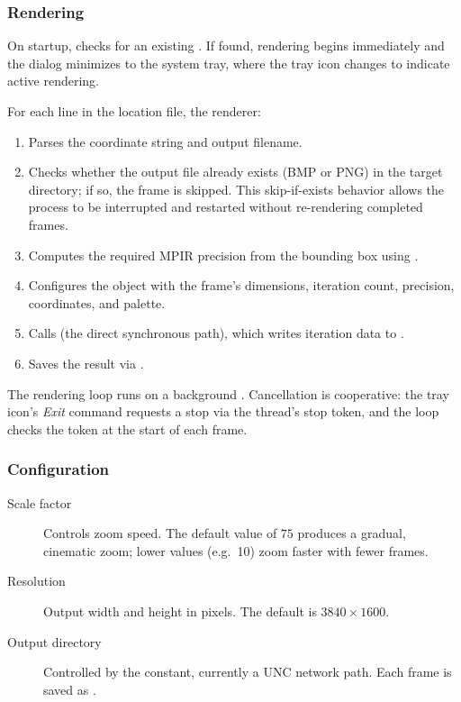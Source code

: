 \subsubsection*{Rendering}

On startup,  checks for an existing
.  If found, rendering begins immediately and
the dialog minimizes to the system tray, where the tray icon changes
to indicate active rendering.

For each line in the location file, the renderer:

\begin{enumerate}
  \item Parses the coordinate string and output filename.
  \item Checks whether the output file already exists (BMP or PNG) in
        the target directory; if so, the frame is skipped.  This
        skip-if-exists behavior allows the process to be interrupted
        and restarted without re-rendering completed frames.
  \item Computes the required MPIR precision from the bounding box
        using .
  \item Configures the  object with the frame's
        dimensions, iteration count, precision, coordinates, and
        palette.
  \item Calls  (the direct synchronous path),
        which writes iteration data to .
  \item Saves the result via .
\end{enumerate}

The rendering loop runs on a background .
Cancellation is cooperative: the tray icon's \emph{Exit} command
requests a stop via the thread's stop token, and the loop checks
the token at the start of each frame.

\subsubsection*{Configuration}

\begin{description}
  \item[Scale factor] Controls zoom speed.  The default value of
    $75$ produces a gradual, cinematic zoom; lower values (e.g.~10)
    zoom faster with fewer frames.
  \item[Resolution] Output width and height in pixels.  The default
    is $3840 \times 1600$.
  \item[Output directory] Controlled by the 
    constant, currently a UNC network path.  Each frame is saved as
    .
\end{description}

